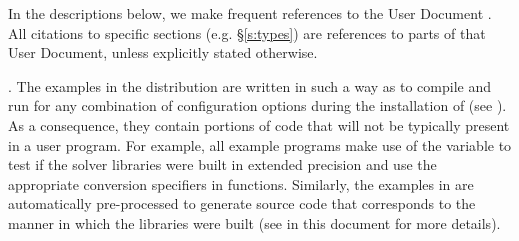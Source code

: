 In the descriptions below, we make frequent references to the {\ida}
User Document \cite{ida2.2.0_ug}.  All citations to specific sections
(e.g. \S\ref{s:types}) are references to parts of that User Document, unless
explicitly stated otherwise.

\vspace{0.2in}. 
The examples in the {\ida} distribution are written in such a way as
to compile and run for any combination of configuration options during
the installation of {\sundials} (see ). As a consequence,
they contain portions of code that will not be typically present in a
user program. For example, all example programs make use of the
variable  to test if the solver libraries
were built in extended precision and use the appropriate conversion 
specifiers in  functions.  Similarly, the {\F} examples in
{\fida} are automatically pre-processed to generate source code that
corresponds to the manner in which the {\ida} libraries were built
(see  in this document for more details).

